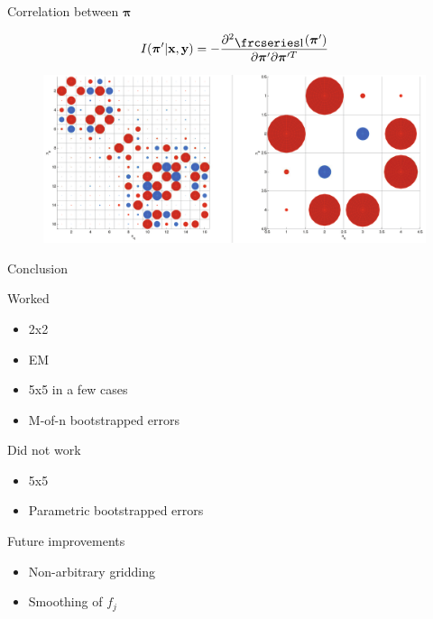 \documentclass{beamer}
\newcommand{\textfrc}[1]{{\frcseries#1}}
\newcommand{\mathfrc}[1]{\raisebox{-0.8mm}{\text{\textfrc{\small #1}}}\hspace{0.4mm}}
\newcommand{\eqn}[1]{\begin{align*}
#1
\end{align*}}
\newcommand{\vect}[1]{\boldsymbol{\mathbf{#1}}}
\newcommand{\vx}{\vect{x}}
\newcommand{\vy}{\vect{y}}
\newcommand{\vp}{\vect{\pi}}
\newcommand{\vpg}{\vp^{\prime}}
\newcommand{\llpp}{\mathfrc{l}(\vpg)}
\begin{document}
\begin{frame}{Correlation between $\vp$}
	
	\eqn{	
		I(\vpg|\vx,\vy)=-\frac{\partial^2 \llpp}{\partial \vp^\prime \partial \vp^{\prime T}}
	}		
	
	\begin{figure}
			\begin{center}
				\includegraphics[width=\textwidth]{correl.pdf}
			\end{center}
	\end{figure}	
	
\end{frame}













\begin{frame}{Conclusion}
	
	Worked
	\begin{itemize}
		\item 2x2
		\item EM
		\item 5x5 in a few cases
		\item M-of-n bootstrapped errors
	\end{itemize}	
	
	Did not work
	\begin{itemize}
		\item 5x5
		\item Parametric bootstrapped errors
	\end{itemize}	
	
	
	Future improvements
	\begin{itemize}
		\item Non-arbitrary gridding
		\item Smoothing of $f_j$
	\end{itemize}	
	
\end{frame}
\end{document}

